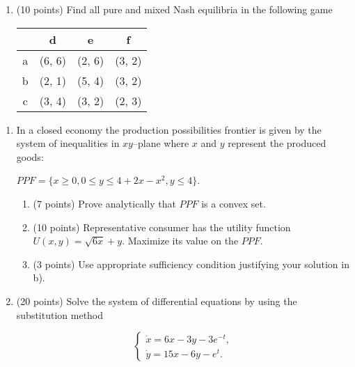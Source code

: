 \begin{enumerate}
\item (10 points) Find all pure and mixed Nash equilibria in the following game

\begin{center}
\begin{tabular}{@{}cccc@{}}
\toprule
  & d & e & f \\ \midrule
a & (6, 6) & (2, 6)  & (3, 2)   \\
b & (2, 1) & (5, 4) & (3, 2)   \\
c & (3, 4) & (3, 2) & (2, 3)   \\ \bottomrule
\end{tabular}
\end{center}

\end{enumerate}    



\begin{enumerate}[resume]

\item In a closed economy the production possibilities frontier is given by the system of inequalities in  $xy$--plane where  $x$ and $y$ represent the produced goods: 

$PPF=\{ x\geq 0,0\leq y\leq 4+2x-x^2,y\leq 4\}$.
\begin{enumerate}
    \item (7 points) Prove analytically that  $PPF$ is a convex set. 
    \item (10 points) Representative consumer has the utility function  $U(x,y)=\sqrt{6x}+y$. Maximize its value on the  $PPF$.
    \item (3 points) Use appropriate sufficiency condition justifying your solution in b).
\end{enumerate}


\item (20 points) Solve the system of differential equations by using the substitution method 

\[
  \begin{cases} 
    \dot{x}= 6x -3y -3e^{-t}, \\ 
    \dot{y}= 15x -6y-e^t.
  \end{cases}
\]


\end{enumerate}

